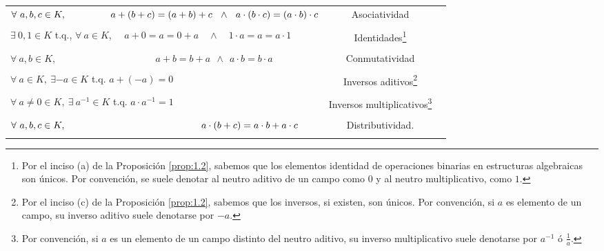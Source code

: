 \documentclass[notasLineal]{subfiles}
\begin{document}
\begin{tcolorbox}[breakable]
\begin{Def}
        \begin{center}
            \begin{tabular}{lcr}
                \\
                $\forall \ a,b,c\in K, \quad \quad \quad \quad \hspace{1mm} \ a+(b+c)=(a+b)+c \ \ \land \ \ a\cdot (b\cdot c)=(a\cdot b)\cdot c$ &\hspace{5mm} Asociatividad \\ \\
                $\exists \ 0,1\in K$ t.q., $\forall \ a\in K$, \ \ \quad $a+0=a=0+a \quad \land \quad 1\cdot a=a=a\cdot1$ &\hspace{10mm} Identidades\footnote{Por el inciso (a) de la Proposición \ref{prop:1.2}, sabemos que los elementos identidad de operaciones binarias en estructuras algebraicas son únicos. Por convención, se suele denotar al neutro aditivo de un campo como $0$ y al neutro multiplicativo, como $1$.} \\ \\
                $\forall \ a,b\in K, \quad \quad \quad \quad \quad \quad \quad \quad \quad \quad \ a+b=b+a \ \ \land \ \ a\cdot b = b\cdot a$ & Conmutatividad \\ \\
                $\forall \ a\in K, \ \exists -a\in K$ t.q. \quad \quad \quad \quad \quad \quad \quad \quad \quad $a + (-a) = 0$ & Inversos aditivos\footnote{Por el inciso (c) de la Proposición \ref{prop:1.2}, sabemos que los inversos, si existen, son únicos. Por convención, si $a$ es elemento de un campo, su inverso aditivo suele denotarse por $-a$.} \\ \\
                $\forall \ a\neq0\in K, \ \exists \ a^{-1}\in K$ t.q. \hspace{2.55cm} \quad $a\cdot a^{-1}= 1$ &\hspace{-11mm}Inversos multiplicativos\footnote{Por convención, si $a$ es un elemento de un campo distinto del neutro aditivo, su inverso multiplicativo suele denotarse por $a^{-1}$ ó $\frac{1}{a}$.} \\ \\
                $\forall \ a,b,c\in K, \hspace{4.95cm}a\cdot (b+c) = a\cdot b+a\cdot c$ & Distributividad. \\ \\
            \end{tabular}
        \end{center}
    \end{Def}
\end{tcolorbox}
\end{document}
